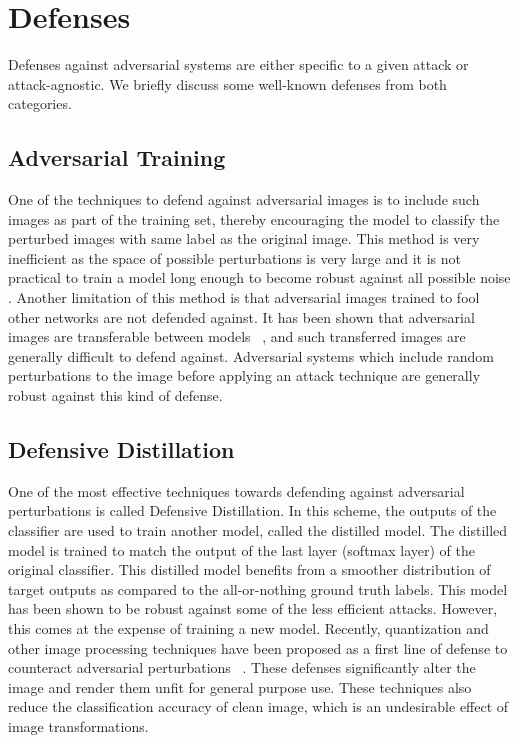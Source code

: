 \section{Defenses} \label{defenses}
Defenses against adversarial systems are either specific to a given attack or attack-agnostic. 
We briefly discuss some well-known defenses from both categories.

\subsection{Adversarial Training}
One of the techniques to defend against adversarial images is to include such images as part of the training set, thereby encouraging the model to classify the perturbed images with same label as the original image. 
This method is very inefficient as the space of possible perturbations is very large and it is not practical to train
a model long enough to become robust against all possible noise \cite{Tramr2017TheSO}. 
Another limitation of this method is that adversarial images trained to fool other networks are not defended against. 
It has been shown that adversarial images are transferable between models ~\cite{Liu2016DelvingIT}, and such transferred images are generally difficult to defend against.
Adversarial systems which include random perturbations to the image before applying an attack technique are generally robust against
this kind of defense.

\subsection{Defensive Distillation}
One of the most effective techniques towards defending against adversarial perturbations is called Defensive Distillation.
In this scheme, the outputs of the classifier are used to train another model, called the distilled model. 
The distilled model is trained to match the output of the last layer (softmax layer) of the original classifier.
This distilled model benefits from a smoother distribution of target outputs as compared to the all-or-nothing ground truth labels.
This model has been shown to be robust against some of the less efficient attacks.
However, this comes at the expense of training a new model.
Recently, quantization and other image processing techniques have been proposed as a first line of defense to counteract adversarial perturbations ~\cite{liang2017detecting,aadityaprakash2018,guo2017countering}. 
These defenses significantly alter the image and render them unfit for general purpose use.
These techniques also reduce the classification accuracy of clean image, which is an undesirable effect of image transformations.

